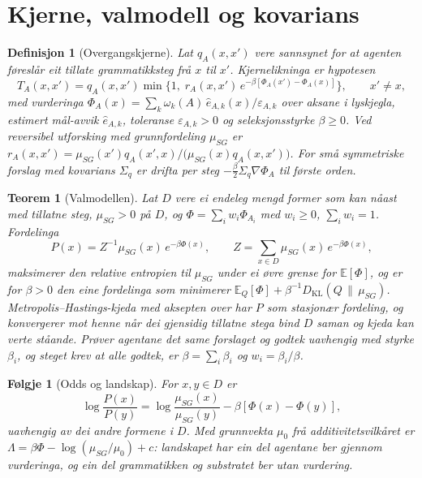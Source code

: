 \documentclass[9pt,twocolumn,a4paper]{article}
\theoremstyle{defstyle}
\newtheorem{definisjon}{Definisjon}
\theoremstyle{formstyle}
\newtheorem{teorem}{Teorem}
\newtheorem{folgje}{Følgje}
\begin{document}
\section{Kjerne, valmodell og kovarians}

\begin{definisjon}[Overgangskjerne]
Lat $q_A(x,x')$ vere sannsynet for at agenten føreslår eit tillate grammatikksteg frå $x$ til $x'$. Kjernelikninga er hypotesen
\[
T_A(x,x') = q_A(x,x')\min\bigl\{1,\; r_A(x,x')\,e^{-\beta[\Phi_A(x')-\Phi_A(x)]}\bigr\},\qquad x'\neq x,
\]
med vurderinga $\Phi_A(x)=\sum_{k}\omega_k(A)\,\hat e_{A,k}(x)/\varepsilon_{A,k}$ over aksane i lyskjegla, estimert mål-avvik $\hat e_{A,k}$, toleranse $\varepsilon_{A,k}>0$ og seleksjonsstyrke $\beta\geq 0$. Ved reversibel utforsking med grunnfordeling $\mu_{SG}$ er $r_A(x,x')=\mu_{SG}(x')q_A(x',x)/\bigl(\mu_{SG}(x)q_A(x,x')\bigr)$. For små symmetriske forslag med kovarians $\Sigma_q$ er drifta per steg $-\tfrac{\beta}{2}\Sigma_q\nabla\Phi_A$ til første orden.
\end{definisjon}

\begin{teorem}[Valmodellen]
Lat $D$ vere ei endeleg mengd former som kan nåast med tillatne steg, $\mu_{SG}>0$ på $D$, og $\Phi=\sum_i w_i\Phi_{A_i}$ med $w_i\geq 0$, $\sum_i w_i=1$. Fordelinga
\[
P(x)=Z^{-1}\mu_{SG}(x)\,e^{-\beta\Phi(x)},\qquad Z=\sum_{x\in D}\mu_{SG}(x)\,e^{-\beta\Phi(x)},
\]
maksimerer den relative entropien til $\mu_{SG}$ under ei øvre grense for $\mathbb{E}[\Phi]$, og er for $\beta>0$ den eine fordelinga som minimerer $\mathbb{E}_Q[\Phi]+\beta^{-1}D_{\mathrm{KL}}(Q\,\|\,\mu_{SG})$. Metropolis--Hastings-kjeda med aksepten over har $P$ som stasjonær fordeling, og konvergerer mot henne når dei gjensidig tillatne stega bind $D$ saman og kjeda kan verte ståande. Prøver agentane det same forslaget og godtek uavhengig med styrke $\beta_i$, og steget krev at alle godtek, er $\beta=\sum_i\beta_i$ og $w_i=\beta_i/\beta$.
\end{teorem}

\begin{folgje}[Odds og landskap]
For $x,y\in D$ er
\[
\log\frac{P(x)}{P(y)}=\log\frac{\mu_{SG}(x)}{\mu_{SG}(y)}-\beta[\Phi(x)-\Phi(y)],
\]
uavhengig av dei andre formene i $D$. Med grunnvekta $\mu_0$ frå additivitetsvilkåret er $\Lambda=\beta\Phi-\log(\mu_{SG}/\mu_0)+c$: landskapet har ein del agentane ber gjennom vurderinga, og ein del grammatikken og substratet ber utan vurdering.
\end{folgje}
\end{document}
